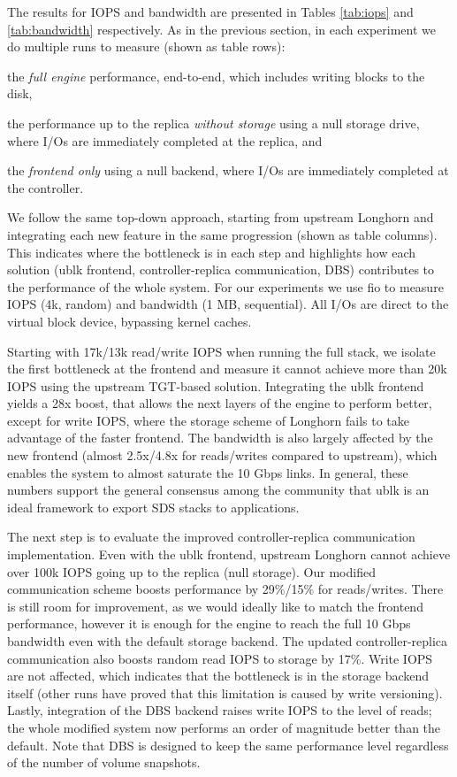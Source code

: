 The results for IOPS and bandwidth are presented in Tables \ref{tab:iops} and \ref{tab:bandwidth} respectively. As in the previous section, in each experiment we do multiple runs to measure (shown as table rows): 
\begin{enumerate*}[label=(\roman*)]
    \item the \textit{full engine} performance, end-to-end, which includes writing blocks to the disk,
    \item the performance up to the replica \textit{without storage} using a null storage drive, where I/Os are immediately completed at the replica, and
    \item the \textit{frontend only} using a null backend, where I/Os are immediately completed at the controller.
\end{enumerate*}
We follow the same top-down approach, starting from upstream Longhorn and integrating each new feature in the same progression (shown as table columns). This indicates where the bottleneck is in each step and highlights how each solution (ublk frontend, controller-replica communication, DBS) contributes to the performance of the whole system.
For our experiments we use fio to measure IOPS (4k, random) and bandwidth (1 MB, sequential). All I/Os are direct to the virtual block device, bypassing kernel caches.

Starting with 17k/13k read/write IOPS when running the full stack, we isolate the first bottleneck at the frontend and measure it cannot achieve more than 20k IOPS using the upstream TGT-based solution. Integrating the ublk frontend yields a 28x boost, that allows the next layers of the engine to perform better, except for write IOPS, where the storage scheme of Longhorn fails to take advantage of the faster frontend. The bandwidth is also largely affected by the new frontend (almost 2.5x/4.8x for reads/writes compared to upstream), which enables the system to almost saturate the 10 Gbps links.
In general, these numbers support the general consensus among the community that ublk is an ideal framework to export SDS stacks to applications.

The next step is to evaluate the improved controller-replica communication implementation. Even with the ublk frontend, upstream Longhorn cannot achieve over 100k IOPS going up to the replica (null storage). Our modified communication scheme boosts performance by 29\%/15\% for reads/writes. There is still room for improvement, as we would ideally like to match the frontend performance, however it is enough for the engine to reach the full 10 Gbps bandwidth even with the default storage backend. The updated controller-replica communication also boosts random read IOPS to storage by 17\%. Write IOPS are not affected, which indicates that the bottleneck is in the storage backend itself (other runs have proved that this limitation is caused by write versioning). Lastly, integration of the DBS backend raises write IOPS to the level of reads; the whole modified system now performs an order of magnitude better than the default. Note that DBS is designed to keep the same performance level regardless of the number of volume snapshots.

